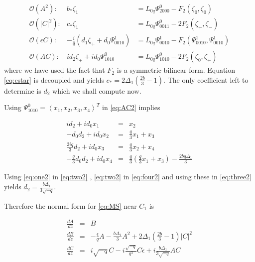 \begin{subequations}
\begin{eqnarray}
\mathcal{O}(A^2): &		b_* \zeta_1 &= L_{0q} \Psi_{2000}^0 - F_2(\zeta_0,\zeta_0) \\
\mathcal{O}(\left|C\right|^2):&	c_* \zeta_1 &= L_{0q} \Psi_{0011}^0 -2 F_2(\zeta_+,\zeta_-) \label{eq:cstar2} \\
\mathcal{O}(\epsilon C): &-\frac{i}{q} \left(d_1 \zeta_+ +  d_0 \Psi_{0010}^1\right) &= L_{0q} \Psi_{0010}^1 - F_2(\Psi_{0010}^1,\Psi_{0010}^1) \\
\mathcal{O}(A C): 	&i d_2 \zeta_+ + i d_0 \Psi_{1010}^0 &= L_{0q} \Psi_{1010}^0 - 2 F_2(\zeta_0,\zeta_+) \label{eq:AC2}
\end{eqnarray}
\end{subequations}
where we have used the fact that $F_2$ is a symmetric bilinear form. Equation \eqref{eq:cstar} is decoupled and yields 
$ c_* = 2 \Delta_1 \left( \frac{2 b}{3}  - 1\right)$. The only coefficient left to determine is $d_2$ which we shall compute now. 

Using $\Psi_{1010}^0 = \left<x_1,x_2,x_3,x_4\right>^T$ in \eqref{eq:AC2} implies 

\begin{subequations}
\begin{eqnarray}
i d_2 + i d_0 x_1 &=& x_2 \label{eq:one2} \\
- d_0 d_2 + i d_0 x_2 &=& \frac{q}{3} x_1 + x_3 \label{eq:two2} \\
\frac{2 i q}{3} d_2 + i d_0 x_3 &=& \frac{q}{3} x_2 + x_4  \label{eq:three2} \\
- \frac{q}{3} d_0 d_2 + i d_0 x_4 &=& \frac{q}{3}\left(\frac{q}{3} x_1 + x_3 \right) - \frac{ 2 b q \Delta_1} {3} \label{eq:four2}
\end{eqnarray}
\end{subequations}

Using \eqref{eq:one2} in \eqref{eq:two2} , \eqref{eq:two2} in \eqref{eq:four2} and
using these in \eqref{eq:three2} yields $ d_2 = \frac{ b \Delta_1 }{ 3 \sqrt{-q} }$.

Therefore the normal form for \eqref{eq:MS} near $C_1$ is 

\begin{subequations}\label{eq:NORMAL2}
\begin{eqnarray} 
\frac{dA}{dz} &=& B  \label{eq:normalA2} \\
\frac{dB}{dz} &=& -\frac{\epsilon}{q} A - \frac{b \Delta_1 }{3} A^2 + 2 \Delta_1 \left(\frac{2 b }{3} - 1\right) \left|C\right|^2  \label{eq:normalB2} \\
\frac{dC}{dz} &=& i \sqrt{-q} C - i \frac{\sqrt{-q} }{q^3} C\epsilon + i \frac{b \Delta_1}{3 \sqrt{-q}} A C \label{eq:normalC2}
\end{eqnarray}
\end{subequations}

